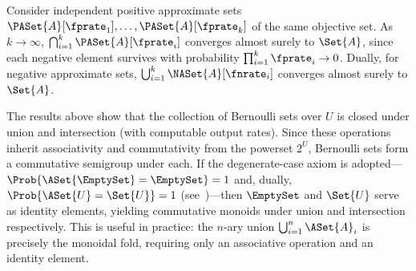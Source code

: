 \begin{remark}
	Consider independent positive approximate sets
	$\PASet{A}[\fprate_1],\ldots,\PASet{A}[\fprate_k]$
	of the same objective set.
	As $k \to \infty$, $\bigcap_{i=1}^{k} \PASet{A}[\fprate_i]$ converges
	almost surely to $\Set{A}$, since each negative element survives with
	probability $\prod_{i=1}^{k} \fprate_i \to 0$.
	Dually, for negative approximate sets,
	$\bigcup_{i=1}^{k} \NASet{A}[\fnrate_i]$ converges almost surely
	to $\Set{A}$.
\end{remark}

\begin{remark}
\label{rem:monoid}
The results above show that the collection of Bernoulli sets over $U$ is
closed under union and intersection (with computable output rates).
Since these operations inherit associativity and commutativity from the
powerset $2^U$, Bernoulli sets form a commutative semigroup under each.
If the degenerate-case axiom is adopted---$\Prob{\ASet{\EmptySet} =
\EmptySet} = 1$ and, dually, $\Prob{\ASet{U} = \Set{U}} = 1$ (see~\cite{bernoulliSets})---then $\EmptySet$ and $\Set{U}$ serve as
identity elements, yielding commutative monoids under union and
intersection respectively.
This is useful in practice: the $n$-ary union
$\bigcup_{i=1}^{n} \ASet{A}_i$ is precisely the monoidal fold, requiring only an
associative operation and an identity element.
\end{remark}
